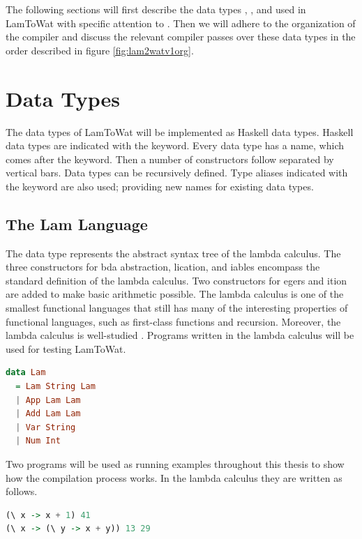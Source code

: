 The following sections will first describe the data types , , and  used in LamToWat with specific attention to . Then we will adhere to the organization of the compiler and discuss the relevant compiler passes over these data types in the order described in figure \ref{fig:lam2watv1org}.

\section{\label{section:datatypes}Data Types}
The data types of LamToWat will be implemented as Haskell data types. Haskell data types are indicated with the  keyword. Every data type has a name, which comes after the keyword. Then a number of constructors follow separated by vertical bars. Data types can be recursively defined. Type aliases indicated with the  keyword are also used; providing new names for existing data types.

\subsection{\label{subsection:expdata}The Lam Language}
The  data type represents the abstract syntax tree of the lambda calculus. The three constructors for bda abstraction, lication, and iables encompass the standard definition of the lambda calculus. Two constructors for egers and ition are added to make basic arithmetic possible. The lambda calculus is one of the smallest functional languages that still has many of the interesting properties of functional languages, such as first-class functions and recursion. Moreover, the lambda calculus is well-studied \autocite{barendregt1984lambda}. Programs written in the lambda calculus will be used for testing LamToWat.

\begin{lstlisting}[language=Haskell]
data Lam
  = Lam String Lam
  | App Lam Lam
  | Add Lam Lam
  | Var String
  | Num Int
\end{lstlisting}

Two programs will be used as running examples throughout this thesis to show how the compilation process works. In the lambda calculus they are written as follows.

\begin{lstlisting}[language=Haskell]
(\ x -> x + 1) 41
(\ x -> (\ y -> x + y)) 13 29
\end{lstlisting}

